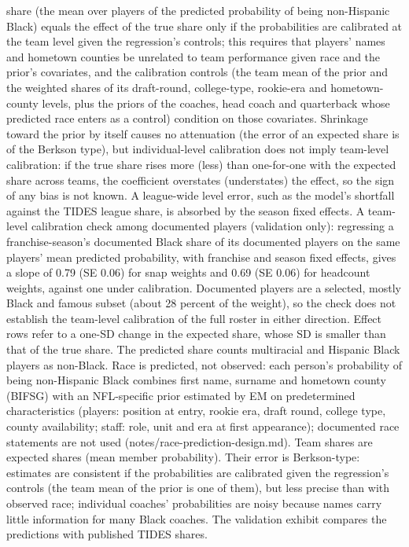 \begin{table}[!h]
{\begin{threeparttable}
\begin{tablenotes}[para]
share (the mean over players of the predicted probability of being non-Hispanic Black) equals the effect of the true share only if the probabilities are calibrated at the team level given the regression's controls; this requires that players' names and hometown counties be unrelated to team performance given race and the prior's covariates, and the calibration controls (the team mean of the prior and the weighted shares of its draft-round, college-type, rookie-era and hometown-county levels, plus the priors of the coaches, head coach and quarterback whose predicted race enters as a control) condition on those covariates. Shrinkage toward the prior by itself causes no attenuation (the error of an expected share is of the Berkson type), but individual-level calibration does not imply team-level calibration: if the true share rises more (less) than one-for-one with the expected share across teams, the coefficient overstates (understates) the effect, so the sign of any bias is not known. A league-wide level error, such as the model's shortfall against the TIDES league share, is absorbed by the season fixed effects. A team-level calibration check among documented players (validation only): regressing a franchise-season's documented Black share of its documented players on the same players' mean predicted probability, with franchise and season fixed effects, gives a slope of 0.79 (SE 0.06) for snap weights and  0.69 (SE 0.06) for headcount weights, against one under calibration. Documented players are a selected, mostly Black and famous subset (about 28 percent of the weight), so the check does not establish the team-level calibration of the full roster in either direction. Effect rows refer to a one-SD change in the expected share, whose SD is smaller than that of the true share. The predicted share counts multiracial and Hispanic Black players as non-Black. Race is predicted, not observed: each person's probability of being non-Hispanic Black combines first name, surname and hometown county (BIFSG) with an NFL-specific prior estimated by EM on predetermined characteristics (players: position at entry, rookie era, draft round, college type, county availability; staff: role, unit and era at first appearance); documented race statements are not used (notes/race-prediction-design.md). Team shares are expected shares (mean member probability). Their error is Berkson-type: estimates are consistent if the probabilities are calibrated given the regression's controls (the team mean of the prior is one of them), but less precise than with observed race; individual coaches' probabilities are noisy because names carry little information for many Black coaches. The validation exhibit compares the predictions with published TIDES shares.
\end{tablenotes}
\end{threeparttable}}
\end{table}
